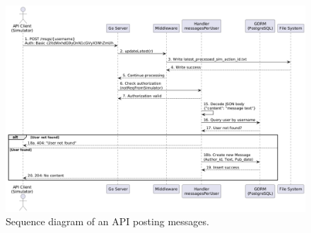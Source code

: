 \begin{figure}[H]
\includegraphics[width=\textwidth]{images/api-seq-diagram.png}
\centering
\caption{Sequence diagram of an API posting messages.}
\label{fig:api-seq}
\end{figure}
